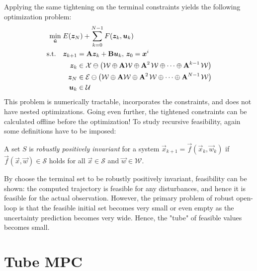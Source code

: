 		Applying the same tightening on the terminal constraints yields the following optimization problem:
		\begin{equation}
			\begin{aligned}
				\min_{\tilde{\bm{u}}}\; & E(\bm{z}_N) + \sum_{k = 0}^{N - 1} F(\bm{z}_k, \bm{u}_k) \\
				\text{s.t.}\quad&
					\begin{aligned}[t]
						\bm{z}_{k + 1} &= \bm{\mathrm{A}} \bm{z}_k + \bm{\mathrm{B}} \bm{u}_k,\, \bm{z}_0 = \bm{x}^i \\
						\bm{z}_k &\in \mathcal{X} \ominus \bigl( \mathcal{W} \oplus \bm{\mathrm{A}} \mathcal{W} \oplus \bm{\mathrm{A}}^{2\,} \mathcal{W} \oplus \cdots \oplus \bm{\mathrm{A}}^{k - 1\,} \mathcal{W} \bigr) \\
						\bm{z}_N &\in \mathcal{E} \ominus \bigl( \mathcal{W} \oplus \bm{\mathrm{A}} \mathcal{W} \oplus \bm{\mathrm{A}}^{2\,} \mathcal{W} \oplus \cdots \oplus \bm{\mathrm{A}}^{N - 1\,} \mathcal{W} \bigr) \\
						\bm{u}_k &\in \mathcal{U}
					\end{aligned}
			\end{aligned}
		\end{equation}
		This problem is numerically tractable, incorporates the constraints, and does not have nested optimizations. Going even further, the tightened constraints can be calculated offline before the optimization! To study recursive feasibility, again some definitions have to be imposed:
		\begin{definition}
			A set \(S\) is \emph{robustly positively invariant} for a system \( \vec{x}_{k + 1} = \vec{f}(\vec{x}_k, \vec{w}_k) \) if \( \vec{f}(\vec{x}, \vec{w}) \in \mathcal{S} \) holds for all \( \vec{x} \in \mathcal{S} \) and \( \vec{w} \in \mathcal{W} \).
		\end{definition}
		By choose the terminal set to be robustly positively invariant, feasibility can be shown: the computed trajectory is feasible for any disturbances, and hence it is feasible for the actual observation. However, the primary problem of robust open-loop is that the feasible initial set becomes very small or even empty as the uncertainty prediction becomes very wide. Hence, the "tube" of feasible values becomes small.

	\section{Tube MPC}
		\label{sec:tubeMpc}

